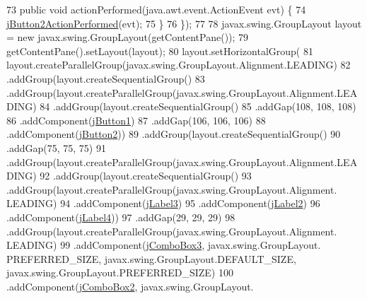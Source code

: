 \begin{DoxyCode}
73             \textcolor{keyword}{public} \textcolor{keywordtype}{void} actionPerformed(java.awt.event.ActionEvent evt) \{
74                 \mbox{\hyperlink{classsoftware_1_1parasoftware8_ab4ed9002057b4f91e7e73b08cae6e8f6}{jButton2ActionPerformed}}(evt);
75             \}
76         \});
77 
78         javax.swing.GroupLayout layout = \textcolor{keyword}{new} javax.swing.GroupLayout(getContentPane());
79         getContentPane().setLayout(layout);
80         layout.setHorizontalGroup(
81             layout.createParallelGroup(javax.swing.GroupLayout.Alignment.LEADING)
82             .addGroup(layout.createSequentialGroup()
83                 .addGroup(layout.createParallelGroup(javax.swing.GroupLayout.Alignment.LEADING)
84                     .addGroup(layout.createSequentialGroup()
85                         .addGap(108, 108, 108)
86                         .addComponent(\mbox{\hyperlink{classsoftware_1_1parasoftware8_a612f7c5f164dcf043b77147fdb81c9ac}{jButton1}})
87                         .addGap(106, 106, 106)
88                         .addComponent(\mbox{\hyperlink{classsoftware_1_1parasoftware8_a60ca7d4c0d486e0f63581416fddf3225}{jButton2}}))
89                     .addGroup(layout.createSequentialGroup()
90                         .addGap(75, 75, 75)
91                         .addGroup(layout.createParallelGroup(javax.swing.GroupLayout.Alignment.LEADING)
92                             .addGroup(layout.createSequentialGroup()
93                                 .addGroup(layout.createParallelGroup(javax.swing.GroupLayout.Alignment.
      LEADING)
94                                     .addComponent(\mbox{\hyperlink{classsoftware_1_1parasoftware8_a4595c84142064d5890fad24684355d2a}{jLabel3}})
95                                     .addComponent(\mbox{\hyperlink{classsoftware_1_1parasoftware8_adf24ffebf260f0020405ef0620116cbc}{jLabel2}})
96                                     .addComponent(\mbox{\hyperlink{classsoftware_1_1parasoftware8_a31d6ce76b8ed34c98cea8fb17bebb099}{jLabel4}}))
97                                 .addGap(29, 29, 29)
98                                 .addGroup(layout.createParallelGroup(javax.swing.GroupLayout.Alignment.
      LEADING)
99                                     .addComponent(\mbox{\hyperlink{classsoftware_1_1parasoftware8_aa9b1b8e891179cb15751500a6d649f88}{jComboBox3}}, javax.swing.GroupLayout.
      PREFERRED\_SIZE, javax.swing.GroupLayout.DEFAULT\_SIZE, javax.swing.GroupLayout.PREFERRED\_SIZE)
100                                     .addComponent(\mbox{\hyperlink{classsoftware_1_1parasoftware8_a71329b43eb81e69956806597744541ab}{jComboBox2}}, javax.swing.GroupLayout.

\end{DoxyCode}
